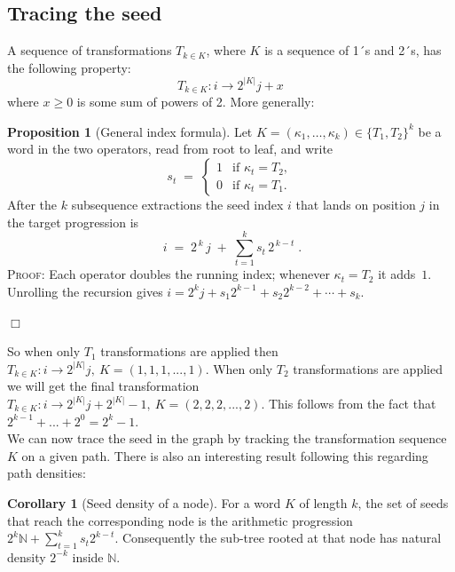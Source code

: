 \documentclass{article}
\theoremstyle{definition}
\newtheorem{proposition}{Proposition}[section]
\newtheorem{corollary}{Corollary}[section]
\begin{document}
\subsection*{Tracing the seed}
A sequence of transformations $T_{k\in K}$, where $K$ is a sequence of 1´s and 2´s, has the following property:
\begin{equation*}
    T_{k\in K}: i \longrightarrow 2^{|K|}j+x
\end{equation*}
where $x\geq0$ is some sum of powers of 2. More generally:
\begin{proposition}[General index formula]\label{proposition:prop2}
Let $K=(\kappa_{1},\dots ,\kappa_{k})\in\{T_{1},T_{2}\}^{k}$ be a word in the
two operators, read from root to leaf, and write
\[
s_{t}\;=\;
  \begin{cases}
    1 &\text{if } \kappa_{t}=T_{2},\\
    0 &\text{if } \kappa_{t}=T_{1}.
  \end{cases}
\]
After the $k$ subsequence extractions the seed index $i$ that lands on
position $j$ in the target progression is
\[
\boxed{\;
  i \;=\; 2^{\,k}\,j \;+\; \sum_{t=1}^{k} s_{t}\,2^{\,k-t}\; }.
\]
\noindent
\textsc{Proof:} Each operator doubles the running index; whenever $\kappa_{t}=T_{2}$ it
adds~$1$.  Unrolling the recursion gives
\(
i = 2^{k} j
    + s_{1} 2^{k-1}
    + s_{2} 2^{k-2}
    + \cdots
    + s_{k}.
\)
\end{proposition}
\begin{flushright}
$\Box$
\end{flushright}
%
So when only $T_1$ transformations are applied then $T_{k\in K}:i\longrightarrow 2^{|K|}j, \ K=(1,1,1,...,1)$. When only $T_2$ transformations are applied we will get the final transformation $T_{k\in K}:i\longrightarrow 2^{|K|}j+2^{|K|}-1, \ K=(2,2,2,...,2)$. This follows from the fact that $2^{k-1}+...+2^0=2^k-1$.
%
\\[.4cm]
%
We can now trace the seed in the graph by tracking the transformation sequence $K$ on a given path. There is also an interesting result following this regarding path densities:

\begin{corollary}[Seed density of a node]
For a word $K$ of length $k$, the set of seeds that reach the
corresponding node is the arithmetic progression
$2^{k}\mathbb{N}+\sum_{t=1}^{k}s_{t}2^{k-t}$.
Consequently the sub-tree rooted at that node has natural
density $2^{-k}$ inside $\mathbb N$.
\end{corollary}
\end{document}
